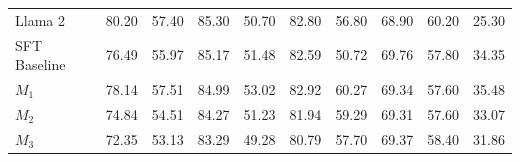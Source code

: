 \documentclass{article}
\begin{document}
\begin{table}[h]
{\begin{tabular}{lccccccccc}
                \midrule
{Llama 2} & 80.20                                   & 57.40                                        & 85.30                                   & 50.70                              & 82.80                              & 56.80                                                                              & 68.90                                                                                         & 60.20                                                                                    & 25.30                                                                           \\
{SFT Baseline}     & 76.49                                  & 55.97                                       & 85.17                                  & 51.48                             & 82.59                             & 50.72                                                                             & 69.76                                                                                  & 57.80                                                                                    & 34.35                                                                          \\
{$M_1$}     & 78.14                                  & 57.51                                       & 84.99                                  & 53.02                             & 82.92                             & 60.27                                                                             & 69.34                                                                                 & 57.60                                                                                    & 35.48                                                                          \\
{$M_2$}     & 74.84                                  & 54.51                                       & 84.27                                  & 51.23                             & 81.94                             & 59.29                                                                             & 69.31                                                                                  & 57.60                                                                                    & 33.07                                                                          \\
{$M_3$}     & 72.35                                  & 53.13                                       & 83.29                                  & 49.28                             & 80.79                             & 57.70                                                                              & 69.37                                                                                  & 58.40                                                                                    & 31.86  \\
\bottomrule
\end{tabular}
}
\end{table}
\end{document}

